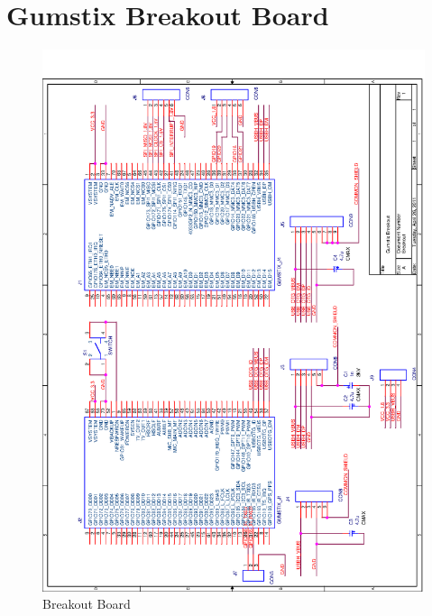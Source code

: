 \documentclass[11pt]{report} %
\begin{document}
	\section{Gumstix Breakout Board}
	\label{gumstix_breakout_diagram}
	\begin{figure}[H]
		\centering
		\includegraphics[scale=0.50]{images/breakout.png}
		\caption{Breakout Board}\label{fig:breakout_board}
	\end{figure}
	
\end{document}
